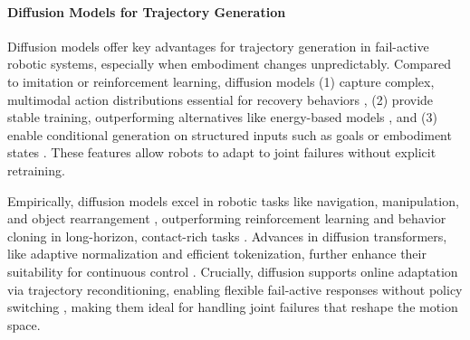 \paragraph{Diffusion Models for Trajectory Generation}
Diffusion models offer key advantages for trajectory generation in fail-active robotic systems, especially when embodiment changes unpredictably. Compared to imitation or reinforcement learning, diffusion models (1) capture complex, multimodal action distributions essential for recovery behaviors \cite{chi2023diffusion}, (2) provide stable training, outperforming alternatives like energy-based models \cite{zhong2023edmp}, and (3) enable conditional generation on structured inputs such as goals or embodiment states \cite{yang2023dimsam}. These features allow robots to adapt to joint failures without explicit retraining.

Empirically, diffusion models excel in robotic tasks like navigation, manipulation, and object rearrangement \cite{sridhar_nomad_2023}, outperforming reinforcement learning and behavior cloning in long-horizon, contact-rich tasks \cite{dasari_ingredients_2024}. Advances in diffusion transformers, like adaptive normalization and efficient tokenization, further enhance their suitability for continuous control \cite{dasari_ingredients_2024}. Crucially, diffusion supports online adaptation via trajectory reconditioning, enabling flexible fail-active responses without policy switching \cite{zhong2023edmp}, making them ideal for handling joint failures that reshape the motion space.



